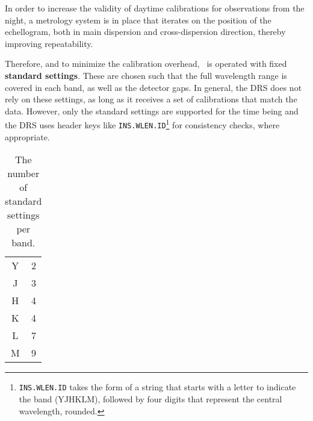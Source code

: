 In order to increase the validity of daytime calibrations for observations from
the night, a metrology system is in place that iterates on the position of the
echellogram, both in main dispersion and cross-dispersion direction, thereby
improving repeatability.

Therefore, and to minimize the calibration overhead, \instrument\ is operated
with fixed \textbf{standard settings}. These are chosen such that the full
wavelength range is covered in each band, as well as the detector gaps. In
general, the DRS does not rely on these settings, as long as it receives a set
of calibrations that match the data. However, only the standard settings are
supported for the time being and the DRS uses header keys like
\texttt{INS.WLEN.ID}\footnote{\texttt{INS.WLEN.ID} takes the form of a string
that starts with a letter to indicate the band (YJHKLM), followed by four digits
that represent the central wavelength, rounded.} for consistency checks, where
appropriate.


\begin{table}[htbp]
  \centering\begin{tabular}{cc}
  Y  & 2\\
  J  & 3\\
  H  & 4\\
  K  & 4\\
  L  & 7\\
  M  & 9\\
  \end{tabular}
  \caption{The number of standard settings per band.}
  \label{tab:nsettings}
\end{table}
